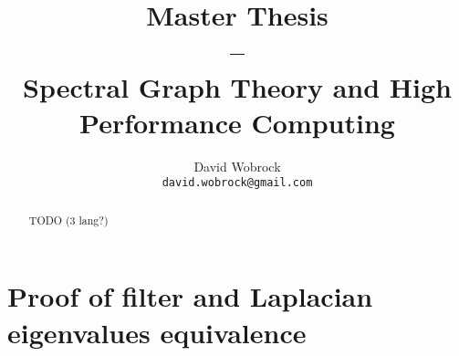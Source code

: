 \documentclass[]{report}
\title{Master Thesis \\ -- \\ Spectral Graph Theory and High Performance Computing}
\author{David Wobrock\\\texttt{david.wobrock@gmail.com}}
\begin{document}
\begin{titlepage}
 \maketitle
\end{titlepage}

\begin{abstract}
 TODO (3 lang?)
\end{abstract}

\tableofcontents
\newpage







\clearpage
\printbibliography

\appendix
\chapter{Proof of filter and Laplacian eigenvalues equivalence}
\label{appendix:eigenvalue_proof}

\end{document}
